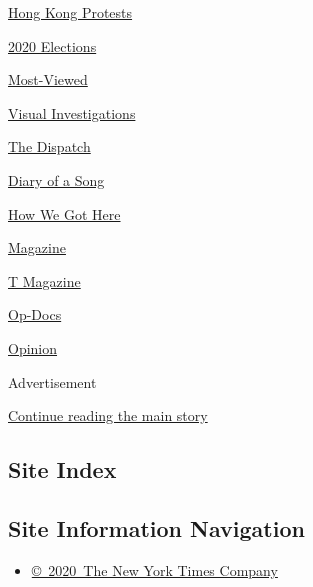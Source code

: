 \href{/video/hk-protest}{Hong Kong Protests}

\href{/video/2020-Elections}{2020 Elections}

\href{/video/Most-Viewed}{Most-Viewed}

\href{/video/investigations}{Visual Investigations}

\href{/video/on-the-ground}{The Dispatch}

\href{/video/diaryofasong}{Diary of a Song}

\href{/video/how-we-got-here}{How We Got Here}

\href{/video/magazine}{Magazine}

\href{/video/t-magazine}{T Magazine}

\href{/video/op-docs}{Op-Docs}

\href{/video/opinion}{Opinion}

Advertisement

\protect\hyperlink{after-bottom}{Continue reading the main story}

\hypertarget{site-index}{%
\subsection{Site Index}\label{site-index}}

\hypertarget{site-information-navigation}{%
\subsection{Site Information
Navigation}\label{site-information-navigation}}

\begin{itemize}
\tightlist
\item
  \href{https://help.nytimes3xbfgragh.onion/hc/en-us/articles/115014792127-Copyright-notice}{©~2020~The
  New York Times Company}
\end{itemize}

